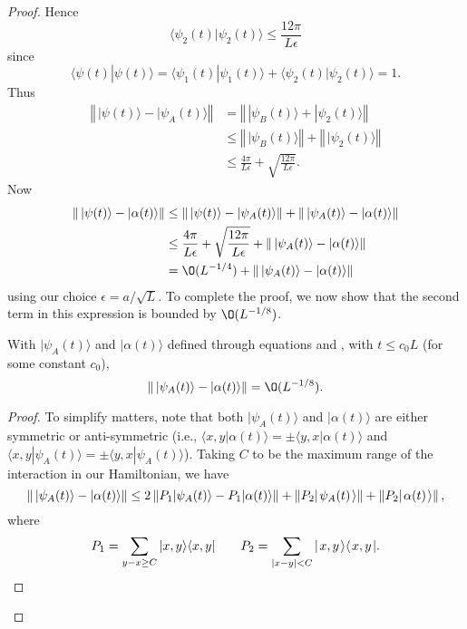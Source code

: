 \documentclass[../thesis-main/thesis-main]{subfiles}
\begin{document}
\begin{proof}
Hence 
\[
  \langle\psi_{2}(t)|\psi_{2}(t)\rangle\leq\frac{12\pi}{L\epsilon}
\]
since 
\[
\langle\psi(t)|\psi(t)\rangle=\langle\psi_{1}(t)|\psi_{1}(t)\rangle+\langle\psi_{2}(t)|\psi_{2}(t)\rangle=1.
\]
Thus
\begin{align*}
\left\Vert \,|\psi(t)\rangle-|\psi_{A}(t)\rangle\right\Vert  & = \left\Vert \,|\psi_{B}(t)\rangle+|\psi_{2}(t)\rangle\right\Vert \\
 & \leq \left\Vert \,|\psi_{B}(t)\rangle\right\Vert +\left\Vert \,|\psi_{2}(t)\rangle\right\Vert \\
 & \leq \frac{4\pi}{L\epsilon}+\sqrt{\frac{12\pi}{L\epsilon}}.
\end{align*}
Now 
\begin{align*}
\left\Vert \,|\psi(t)\rangle-|\alpha(t)\rangle\right\Vert  & \leq \left\Vert \,|\psi(t)\rangle-|\psi_{A}(t)\rangle\right\Vert +\left\Vert \,|\psi_{A}(t)\rangle-|\alpha(t)\rangle\right\Vert \\
 & \leq \frac{4\pi}{L\epsilon}+\sqrt{\frac{12\pi}{L\epsilon}}+\left\Vert \,|\psi_{A}(t)\rangle-|\alpha(t)\rangle\right\Vert \\
 & = \O(L^{-{1}/{4}})+\left\Vert \,|\psi_{A}(t)\rangle-|\alpha(t)\rangle\right\Vert 
\end{align*}
using our choice $\epsilon=a/\sqrt{L}$. To complete the
proof, we now show that the second term in this expression is bounded by $\O(L^{-{1}/{8}})$.
\begin{lemma}
With $|\psi_{A}(t)\rangle$ and $|\alpha(t)\rangle$ defined through
equations  and , with $t\leq c_{0}L$ (for some constant $c_{0}$), 
\[
\left\Vert \,|\psi_{A}(t)\rangle-|\alpha(t)\rangle\right\Vert = \O(L^{-{1}/{8}}).
\]
\end{lemma}
\begin{proof}
To simplify matters, note that both $|\psi_{A}(t)\rangle$ and $|\alpha(t)\rangle$ are either symmetric or anti-symmetric (i.e., $\langle x,y|\alpha(t)\rangle=\pm\langle y,x|\alpha(t)\rangle$ and $\langle x,y|\psi_{A}(t)\rangle=\pm\langle y,x|\psi_{A}(t)\rangle$).  Taking $C$ to be the maximum range of the interaction in our Hamiltonian, we have
\[
\left\Vert \,|\psi_{A}(t)\rangle-|\alpha(t)\rangle\right\Vert \leq2\left\Vert P_{1}|\psi_{A}(t)\rangle-P_{1}|\alpha(t)\rangle\right\Vert  + \left\Vert P_2 |\mspace{2mu} \psi_A(t) \mspace{2mu} \rangle\right\Vert + \left \Vert P_2 |\mspace{2mu} \alpha(t) \mspace{2mu} \rangle\right\Vert,
\]
where
\[
     P_{1}=\sum_{y-x \geq C}|x,y\rangle\langle x,y| 
     \qquad P_2 = \sum_{|x-y| < C} |\mspace{2mu} x,y \mspace{2mu} \rangle\langle\mspace{2mu} x,y \mspace{2mu} |.
\]


\end{proof}
\end{proof}
\end{document}

